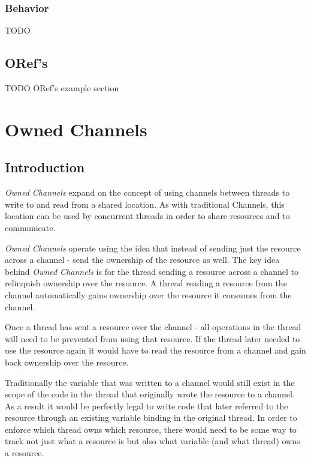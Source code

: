 \documentclass[onehalf,11pt]{beavtex}
\begin{document}
\subsection{Behavior}

TODO


\section{ORef's}

TODO ORef's example section


\chapter{Owned Channels}

\section{Introduction}

\textit{Owned Channels} expand on the concept of using channels between threads
to write to and read from a shared location.   As with traditional Channels,
this location can be used by concurrent threads in order to share resources and
to communicate.


\textit{Owned Channels} operate using the idea that instead of sending just the
resource across a channel - send the ownership of the resource as well.
The key idea behind \textit{Owned Channels} is for the thread sending a
resource across a channel to relinquish ownership over the resource.
A thread reading a resource from the channel automatically gains ownership over
the resource it consumes from the channel.

Once a thread has sent a resource over the channel - all operations in the thread
will need to be prevented from using that resource.
If the thread later needed to use the resource again it would have to read the
resource from a channel and gain back ownership over the resource.

Traditionally the variable that was written to a channel would still exist in the
scope of the code in the thread that originally wrote the resource to a channel.
As a result it would be perfectly legal to write code that later referred to the
resource through an existing variable binding in the original thread.
In order to enforce which thread owns which resource, there would need to be
some way to track not just what a resource is but also what variable (and what
thread) owns a resource.
\end{document}
